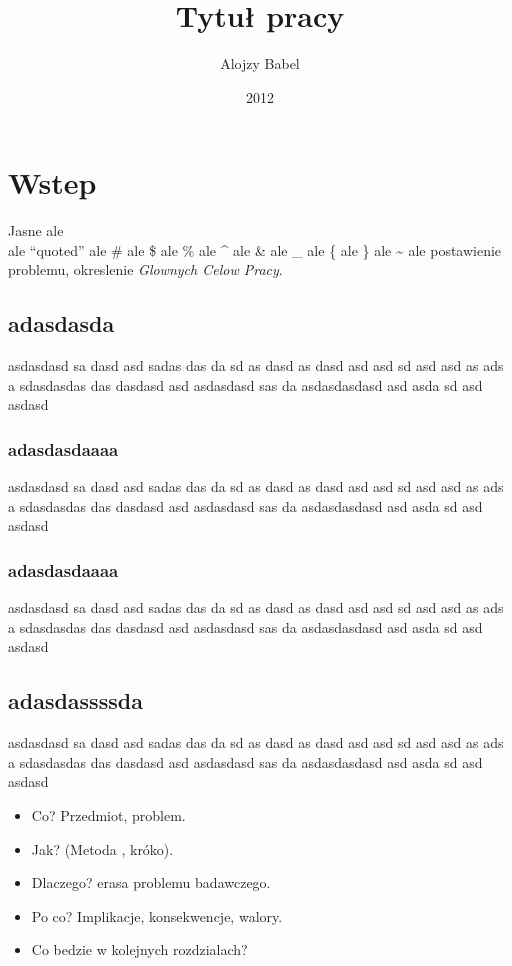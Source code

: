 \documentclass[14pt]{article}
\title{Tytuł pracy}
\author{Alojzy Babel}
\date{2012}
\begin{document}
\maketitle


\section{Wstep}
Jasne ale \\ ale ``quoted'' ale \# ale \$ ale \% ale \^{} ale \& ale \_ ale \{ ale \} ale \~{} ale postawienie problemu, okreslenie \emph{Glownych Celow Pracy}.

\subsection{adasdasda}
asdasdasd sa dasd asd sadas das da sd as dasd as dasd asd asd sd asd asd as ads a sdasdasdas das dasdasd asd asdasdasd sas da asdasdasdasd asd asda sd asd asdasd

\subsubsection{adasdasdaaaa}
asdasdasd sa dasd asd sadas das da sd as dasd as dasd asd asd sd asd asd as ads a sdasdasdas das dasdasd asd asdasdasd sas da asdasdasdasd asd asda sd asd asdasd

\subsubsection{adasdasdaaaa}
asdasdasd sa dasd asd sadas das da sd as dasd as dasd asd asd sd asd asd as ads a sdasdasdas das dasdasd asd asdasdasd sas da asdasdasdasd asd asda sd asd asdasd

\subsection{adasdassssda}
asdasdasd sa dasd asd sadas das da sd as dasd as dasd asd asd sd asd asd as ads a sdasdasdas das dasdasd asd asdasdasd sas da asdasdasdasd asd asda sd asd asdasd

\begin{itemize}

\item Co? Przedmiot, problem.

\item Jak? (Metoda , króko).

\item Dlaczego? erasa problemu badawczego.

\item Po co? Implikacje, konsekwencje, walory.

\item  Co bedzie w kolejnych rozdzialach?
\end{itemize}
\end{document}
